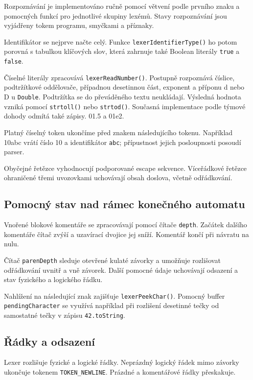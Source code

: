 \documentclass{article}
\begin{document}
Rozpoznávání je implementováno ručně pomocí větvení podle prvního znaku a pomocných funkcí pro jednotlivé skupiny lexémů. Stavy rozpoznávání jsou vyjádřeny tokem programu, smyčkami a příznaky.

Identifikátor se nejprve načte celý. Funkce \texttt{lexerIdentifierType()} ho potom porovná s tabulkou klíčových slov, která zahrnuje také Boolean literály \texttt{true} a \texttt{false}.

Číselné literály zpracovává \texttt{lexerReadNumber()}. Postupně rozpoznává číslice, podtržítkové oddělovače, případnou desetinnou část, exponent a příponu d nebo D u \texttt{Double}. Podtržítka se do převáděného textu neukládají. Výsledná hodnota vzniká pomocí \texttt{strtoll()} nebo \texttt{strtod()}. Současná implementace podle týmové dohody odmítá také zápisy. 01.5 a 01e2.

Platný číselný token ukončíme před znakem následujícího tokenu. Například 10abc vrátí číslo 10 a identifikátor \texttt{abc}; přípustnost jejich posloupnosti posoudí parser.

Obyčejné řetězce vyhodnocují podporované escape sekvence. Víceřádkové řetězce ohraničené třemi uvozovkami uchovávají obsah doslova, včetně odřádkování.

\subsection{Pomocný stav nad rámec konečného automatu}

Vnořené blokové komentáře se zpracovávají pomocí čítače \texttt{depth}. Začátek dalšího komentáře čítač zvýší a uzavírací dvojice jej sníží. Komentář končí při návratu na nulu.

Čítač \texttt{parenDepth} sleduje otevřené kulaté závorky a umožňuje rozlišovat odřádkování uvnitř a vně závorek. Další pomocné údaje uchovávají odsazení a stav fyzického a logického řádku.

Nahlížení na následující znak zajišťuje \texttt{lexerPeekChar()}. Pomocný buffer \texttt{pendingCharacter} se využívá například při rozlišení desetinné tečky od samostatné tečky v zápisu \texttt{42.toString}.

\subsection{Řádky a odsazení}

Lexer rozlišuje fyzické a logické řádky. Neprázdný logický řádek mimo závorky ukončuje tokenem \texttt{TOKEN\_NEWLINE}. Prázdné a komentářové řádky přeskakuje.
\end{document}
